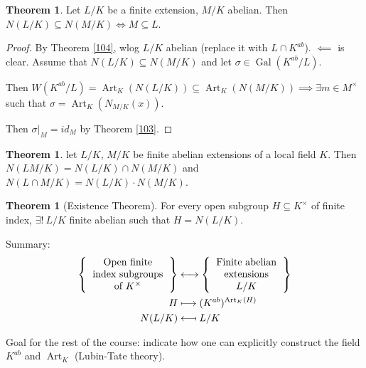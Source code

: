 \documentclass[a4paper]{article}
\theoremstyle{definition}
\theoremstyle{default}
\newtheorem{theorem}[definition]{Theorem}
\theoremstyle{remark}
\DeclareMathOperator{\Gal}{Gal}
\DeclareMathOperator{\Art}{Art}
\begin{document}
\begin{theorem}
	Let $L/K$ be a finite extension, $M/K$ abelian.
	Then $N(L/K) \subseteq N(M/K) \iff M \subseteq L$.
\end{theorem}
\begin{proof}
	By Theorem \ref{104}, wlog $L/K$ abelian (replace it with $L\cap K^{ab}$).
	$\impliedby$ is clear. Assume that $N(L/K) \subseteq N(M/K)$ and let $\sigma \in \Gal(K^{ab}/L)$.
	
	Then $W(K^{ab}/L) = \Art_K(N(L/K)) \subseteq \Art_K(N(M/K)) \implies \exists m \in M^\times$ such that $\sigma = \Art_K(N_{M/K}(x))$.
	
	Then $\sigma|_M = id_M$ by Theorem \ref{103}.
\end{proof}

\begin{theorem}
	let $L/K$, $M/K$ be finite abelian extensions of a local field $K$.
	Then $N(LM/K) = N(L/K) \cap N(M/K)$
	and $N(L \cap M/K) = N(L/K)\cdot N(M/K)$.
\end{theorem}

\begin{theorem}[Existence Theorem]
	For every open subgroup $H \subseteq K^\times$ of finite index,
	$\exists !\ L/K$ finite abelian such that $H=N(L/K)$.
\end{theorem}

Summary:
\begin{align*}
	\left\{\begin{tabular}{c}
	Open finite \\ index subgroups \\ of $K^\times$
	\end{tabular}\right\} &\longleftrightarrow
	\left\{\begin{tabular}{c}
	Finite abelian \\ extensions \\ $L/K$
	\end{tabular}\right\} \\
	H & \longmapsto (K^{ab})^{\Art_K(H)} \\
	N(L/K) &\longmapsfrom L/K
\end{align*}

Goal for the rest of the course:
indicate how one can explicitly construct the field $K^{ab}$ and $\Art_K$ (Lubin-Tate theory).
\end{document}
